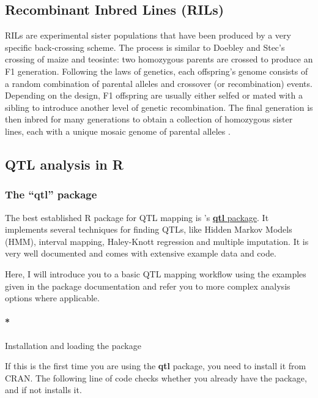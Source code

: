 \documentclass[12pt,]{book}
\let\oldparagraph\paragraph
\renewcommand{\paragraph}[1]{\oldparagraph{#1}\mbox{}}
\begin{document}
\subsection{Recombinant Inbred Lines
(RILs)}\label{recombinant-inbred-lines-rils}

RILs are experimental sister populations that have been produced by a
very specific back-crossing scheme. The process is similar to Doebley
and Stec's crossing of maize and teosinte: two homozygous parents are
crossed to produce an F1 generation. Following the laws of genetics,
each offspring's genome consists of a random combination of parental
alleles and crossover (or recombination) events. Depending on the
design, F1 offspring are usually either selfed or mated with a sibling
to introduce another level of genetic recombination. The final
generation is then inbred for many generations to obtain a collection of
homozygous sister lines, each with a unique mosaic genome of parental
alleles \citep{Pollard2012}.

\subsection{QTL analysis in R}\label{qtl-analysis-in-r}

\subsubsection{\texorpdfstring{The ``qtl''
package}{The qtl package}}\label{the-qtl-package}

The best established R package for QTL mapping is \citet{Broman2003}'s
\href{http://www.rqtl.org/}{\textbf{qtl} package}. It implements several
techniques for finding QTLs, like Hidden Markov Models (HMM), interval
mapping, Haley-Knott regression and multiple imputation. It is very well
documented and comes with extensive example data and code.

Here, I will introduce you to a basic QTL mapping workflow using the
examples given in the package documentation and refer you to more
complex analysis options where applicable.

\paragraph*{Installation and loading the
package}\label{installation-and-loading-the-package}

If this is the first time you are using the \textbf{qtl} package, you
need to install it from CRAN. The following line of code checks whether
you already have the package, and if not installs it.
\end{document}
